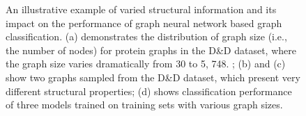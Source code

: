 \documentclass[11pt,dvipdfm]{article}
\begin{document}
\begin{figure}%

    \centering
    
    \qquad

    \caption{An illustrative example of varied structural information and its impact on the performance of graph neural network based graph classification. (a) demonstrates the distribution of graph size (i.e., the number of nodes) for protein graphs in the D\&D dataset, where the graph size
    varies dramatically from 30 to 5, 748. ; (b) and (c) show two graphs sampled from the D\&D dataset, which present very different structural properties; (d) shows classification performance of three models trained on training sets with various graph sizes.}%

    \label{fig:DD-intro}

\end{figure}
\end{document}
